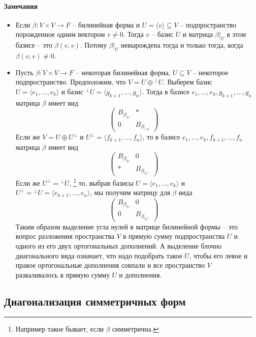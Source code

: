 \paragraph{Замечания}

\begin{itemize}
\item Если $\beta\colon V\times V\to F$ -- билинейная форма и $U =\langle v \rangle \subseteq V$ -- подпространство порожденное одним вектором $v\neq 0$.
Тогда $v$ -- базис $U$ и матрица $\beta|_U$ в этом базисе -- это $\beta(v, v)$.
Потому $\beta|_U$ невырождена тогда и только тогда, когда $\beta(v, v)\neq 0$.

\item Пусть $\beta\colon V\times V\to F$ -- некоторая билинейная форма, $U\subseteq V$ -- некоторое подпространство.
Предположим, что $V = U \oplus {}^\bot U$.
Выберем базис $U = \langle e_1,\ldots,e_k\rangle$ и базис ${}^\bot U = \langle g_{k+1},\ldots, g_n\rangle$.
Тогда в базисе $e_1,\ldots,e_k, g_{k+1}, \ldots, g_n$ матрица $\beta$ имеет вид
\[
\begin{pmatrix}
{B_{\beta|_U}}&{*}\\
{0}&{B_{\beta|_{{}^\bot U}}}
\end{pmatrix}
\]
Если же $V = U \oplus U^\bot$ и $U^\bot =\langle f_{k+1},\ldots, f_n\rangle$, то в базисе $e_1,\ldots,e_k,f_{k+1},\ldots, f_n$ матрица $\beta$ имеет вид
\[
\begin{pmatrix}
{B_{\beta|_U}}&{0}\\
{*}&{B_{\beta|_{U^\bot}}}
\end{pmatrix}
\]
Если же $U^\bot = {}^\bot U$,%
\footnote{Например такое бывает, если $\beta$ симметрична.}
то, выбрав базисы $U = \langle e_1,\ldots,e_k\rangle$ и $U^\bot = {}^\bot U = \langle e_{k+1}, \ldots, e_n\rangle$, мы получим матрицу для $\beta$ вида
\[
\begin{pmatrix}
{B_{\beta|_U}}&{0}\\
{0}&{B_{\beta|_{U^\bot}}}
\end{pmatrix}
\]
Таким образом выделение угла нулей в матрице билинейной формы -- это вопрос разложения пространства $V$ в прямую сумму подпространства $U$ и одного из его двух ортогональных дополнений.
А выделение блочно диагонального вида означает, что надо подобрать такое $U$, чтобы его левое и правое ортогональные дополнения совпали и все пространство $V$ разваливалось в прямую сумму $U$ и дополнения.
\end{itemize}

\subsection{Диагонализация симметричных форм}

